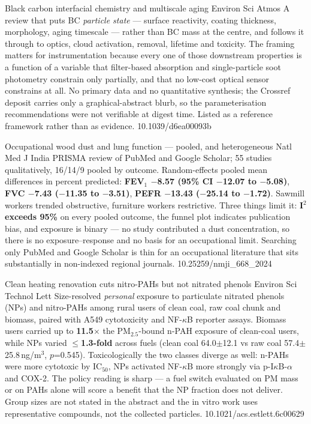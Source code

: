 \documentclass[10pt]{article}
\begin{document}
{Black carbon interfacial chemistry and multiscale aging}
{Environ Sci Atmos}
{A review that puts BC \emph{particle state} --- surface reactivity, coating thickness,
morphology, aging timescale --- rather than BC mass at the centre, and follows it through
to optics, cloud activation, removal, lifetime and toxicity. The framing matters for
instrumentation because every one of those downstream properties is a function of a
variable that filter-based absorption and single-particle soot photometry constrain only
partially, and that no low-cost optical sensor constrains at all. No primary data and no
quantitative synthesis; the Crossref deposit carries only a graphical-abstract blurb, so
the parameterisation recommendations were not verifiable at digest time. Listed as a
reference framework rather than as evidence.}
{10.1039/d6ea00093b}


{Occupational wood dust and lung function --- pooled, and heterogeneous}
{Natl Med J India}
{PRISMA review of PubMed and Google Scholar; 55 studies qualitatively, 16/14/9 pooled by
outcome. Random-effects pooled mean differences in percent predicted:
\textbf{FEV$_1$ $-$8.57 (95\% CI $-$12.07 to $-$5.08)}, \textbf{FVC $-$7.43
($-$11.35 to $-$3.51)}, \textbf{PEFR $-$13.43 ($-$25.14 to $-$1.72)}. Sawmill workers
trended obstructive, furniture workers restrictive. Three things limit it:
\textbf{I$^2$ exceeds 95\%} on every pooled outcome, the funnel plot indicates publication
bias, and exposure is binary --- no study contributed a dust concentration, so there is no
exposure--response and no basis for an occupational limit. Searching only PubMed and
Google Scholar is thin for an occupational literature that sits substantially in
non-indexed regional journals.}
{10.25259/nmji\_668\_2024}

{Clean heating renovation cuts nitro-PAHs but not nitrated phenols}
{Environ Sci Technol Lett}
{Size-resolved \emph{personal} exposure to particulate nitrated phenols (NPs) and
nitro-PAHs among rural users of clean coal, raw coal chunk and biomass, paired with A549
cytotoxicity and NF-$\kappa$B reporter assays. Biomass users carried up to
\textbf{11.5$\times$} the PM$_{2.5}$-bound n-PAH exposure of clean-coal users, while NPs
varied \textbf{$\leq$1.3-fold} across fuels (clean coal 64.0$\pm$12.1 vs raw coal
57.4$\pm$25.8\,ng/m$^3$, $p$=0.545). Toxicologically the two classes diverge as well:
n-PAHs were more cytotoxic by IC$_{50}$, NPs activated NF-$\kappa$B more strongly via
p-I$\kappa$B-$\alpha$ and COX-2. The policy reading is sharp --- a fuel switch evaluated on
PM mass or on PAHs alone will score a benefit that the NP fraction does not deliver.
Group sizes are not stated in the abstract and the in vitro work uses representative
compounds, not the collected particles.}
{10.1021/acs.estlett.6c00629}
\end{document}
